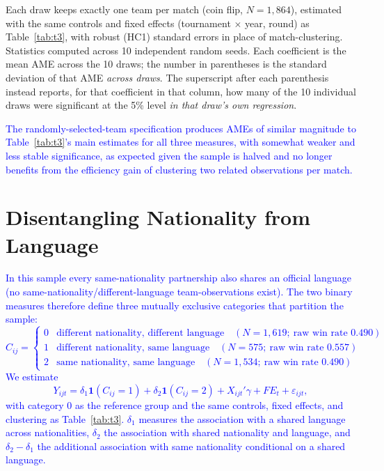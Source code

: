\documentclass[10pt]{article}
\begin{document}
\begin{table}[htbp]
\begin{threeparttable}
\begin{tablenotes}
\small
\item Each draw keeps exactly one team per match (coin flip, $N=1{,}864$), estimated with the same controls and fixed effects (tournament $\times$ year, round) as Table~\ref{tab:t3}, with robust (HC1) standard errors in place of match-clustering. Statistics computed across 10 independent random seeds. Each coefficient is the mean AME across the 10 draws; the number in parentheses is the standard deviation of that AME \emph{across draws}. The superscript after each parenthesis instead reports, for that coefficient in that column, how many of the 10 individual draws were significant at the 5\% level \emph{in that draw's own regression}.
\end{tablenotes}
\end{threeparttable}
\end{table}
\FloatBarrier

\textcolor{blue}{The randomly-selected-team specification produces AMEs of similar magnitude to Table~\ref{tab:t3}'s main estimates for all three measures, with somewhat weaker and less stable significance, as expected given the sample is halved and no longer benefits from the efficiency gain of clustering two related observations per match.\\}

\section{Disentangling Nationality from Language}
\label{app:natlang}

\textcolor{blue}{In this sample every same-nationality partnership also shares an official language (no same-nationality/different-language team-observations exist). The two binary measures therefore define three mutually exclusive categories that partition the sample:
\[
C_{ij}=\begin{cases}
0 & \text{different nationality, different language} \quad (N=1{,}619;\ \text{raw win rate } 0.490)\\
1 & \text{different nationality, same language} \quad (N=575;\ \text{raw win rate } 0.557)\\
2 & \text{same nationality, same language} \quad (N=1{,}534;\ \text{raw win rate } 0.490)
\end{cases}
\]
 We estimate
\[
Y_{ijt}=\delta_1\mathbf{1}(C_{ij}=1)+\delta_2\mathbf{1}(C_{ij}=2)+X_{ijt}'\gamma+FE_t+\varepsilon_{ijt},
\]
with category 0 as the reference group and the same controls, fixed effects, and clustering as Table~\ref{tab:t3}. $\delta_1$ measures the association with a shared language across nationalities, $\delta_2$ the association with shared nationality and language, and $\delta_2-\delta_1$ the additional association with same nationality conditional on a shared language.}
\end{document}
